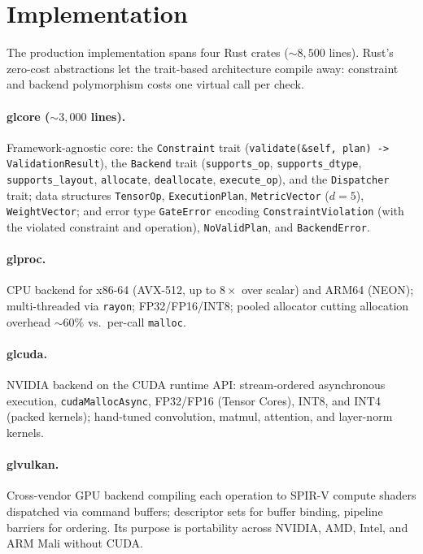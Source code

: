 \section{Implementation}
\label{sec:implementation}

The production implementation spans four Rust crates
(${\sim}8{,}500$ lines). Rust's zero-cost abstractions let the
trait-based architecture compile away: constraint and backend
polymorphism costs one virtual call per check.

\paragraph{glcore (${\sim}3{,}000$ lines).}
Framework-agnostic core: the \texttt{Constraint} trait
(\texttt{validate(\&self, plan) -> ValidationResult}), the
\texttt{Backend} trait (\texttt{supports\_op}, \texttt{supports\_dtype},
\texttt{supports\_layout}, \texttt{allocate}, \texttt{deallocate},
\texttt{execute\_op}), and the \texttt{Dispatcher} trait; data
structures \texttt{TensorOp}, \texttt{ExecutionPlan},
\texttt{MetricVector} ($d = 5$), \texttt{WeightVector}; and error type
\texttt{GateError} encoding \texttt{ConstraintViolation} (with the
violated constraint and operation), \texttt{NoValidPlan}, and
\texttt{BackendError}.

\paragraph{glproc.}
CPU backend for x86-64 (AVX-512, up to $8\times$ over scalar) and ARM64
(NEON); multi-threaded via \texttt{rayon}; FP32/FP16/INT8; pooled
allocator cutting allocation overhead ${\sim}60\%$ vs.\ per-call
\texttt{malloc}.

\paragraph{glcuda.}
NVIDIA backend on the CUDA runtime API: stream-ordered asynchronous
execution, \texttt{cudaMallocAsync}, FP32/FP16 (Tensor Cores), INT8,
and INT4 (packed kernels); hand-tuned convolution, matmul, attention,
and layer-norm kernels.

\paragraph{glvulkan.}
Cross-vendor GPU backend compiling each operation to SPIR-V compute
shaders dispatched via command buffers; descriptor sets for buffer
binding, pipeline barriers for ordering. Its purpose is portability
across NVIDIA, AMD, Intel, and ARM Mali without CUDA.

